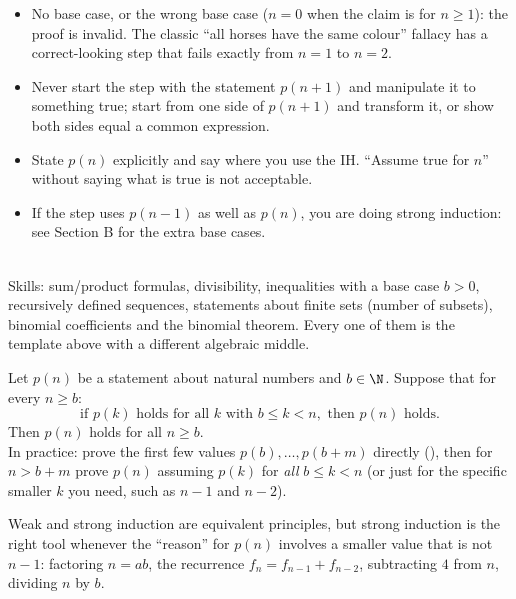 \begin{warn}
\begin{itemize}
\item No base case, or the wrong base case ($n=0$ when the claim is for $n\ge1$): the proof is invalid. The classic ``all horses have the same colour'' fallacy has a correct-looking step that fails exactly from $n=1$ to $n=2$.
\item Never start the step with the statement $p(n+1)$ and manipulate it to something true; start from one side of $p(n+1)$ and transform it, or show both sides equal a common expression.
\item State $p(n)$ explicitly and say where you use the IH. ``Assume true for $n$'' without saying what is true is not acceptable.
\item If the step uses $p(n-1)$ as well as $p(n)$, you are doing strong induction: see Section B for the extra base cases.
\end{itemize}
\end{warn}

\begin{planning}
\quad {}\\[3pt]
Skills: sum/product formulas, divisibility, inequalities with a base case $b>0$, recursively defined sequences, statements about finite sets (\eg number of subsets), binomial coefficients and the binomial theorem. Every one of them is the template above with a different algebraic middle.
\end{planning}


\begin{result}
Let $p(n)$ be a statement about natural numbers and $b\in\N$. Suppose that for every $n\ge b$:
\[
\text{if } p(k) \text{ holds for all } k \text{ with } b\le k<n, \text{ then } p(n) \text{ holds.}
\]
Then $p(n)$ holds for all $n\ge b$.\\
In practice: prove the first few values $p(b),\dots,p(b+m)$ directly (), then for $n>b+m$ prove $p(n)$ assuming $p(k)$ for \emph{all} $b\le k<n$ (or just for the specific smaller $k$ you need, such as $n-1$ and $n-2$).
\end{result}
Weak and strong induction are equivalent principles, but strong induction is the right tool whenever the ``reason'' for $p(n)$ involves a smaller value that is not $n-1$: factoring $n=ab$, the recurrence $f_{n}=f_{n-1}+f_{n-2}$, subtracting $4$ from $n$, dividing $n$ by $b$.

